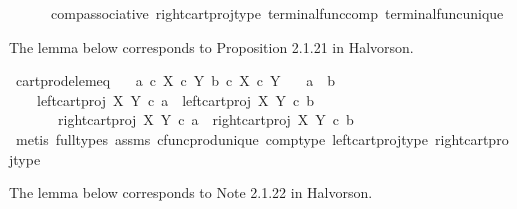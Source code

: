 \begin{isabellebody}
\ \ \ \ \ \ comp{\isacharunderscore}{\kern0pt}associative{}\ right{\isacharunderscore}{\kern0pt}cart{\isacharunderscore}{\kern0pt}proj{\isacharunderscore}{\kern0pt}type\ terminal{\isacharunderscore}{\kern0pt}func{\isacharunderscore}{\kern0pt}comp\ terminal{\isacharunderscore}{\kern0pt}func{\isacharunderscore}{\kern0pt}unique{\isacharparenright}{\kern0pt}%
\endisatagproof
{\isafoldproof}%
%
\isadelimproof
%
\endisadelimproof
%
\begin{isamarkuptext}%
The lemma below corresponds to Proposition 2.1.21 in Halvorson.%
\end{isamarkuptext}\isamarkuptrue%
\isamarkupfalse%
\ cart{\isacharunderscore}{\kern0pt}prod{\isacharunderscore}{\kern0pt}elem{\isacharunderscore}{\kern0pt}eq{\isacharcolon}{\kern0pt}\isanewline
\ \ \ {\isachardoublequoteopen}a\ {\isasymin}\isactrlsub c\ X\ {\isasymtimes}\isactrlsub c\ Y{\isachardoublequoteclose}\ {\isachardoublequoteopen}b\ {\isasymin}\isactrlsub c\ X\ {\isasymtimes}\isactrlsub c\ Y{\isachardoublequoteclose}\isanewline
\ \ \ {\isachardoublequoteopen}a\ {\isacharequal}{\kern0pt}\ b\ {\isasymlongleftrightarrow}\ \isanewline
\ \ \ \ {\isacharparenleft}{\kern0pt}left{\isacharunderscore}{\kern0pt}cart{\isacharunderscore}{\kern0pt}proj\ X\ Y\ {\isasymcirc}\isactrlsub c\ a\ {\isacharequal}{\kern0pt}\ left{\isacharunderscore}{\kern0pt}cart{\isacharunderscore}{\kern0pt}proj\ X\ Y\ {\isasymcirc}\isactrlsub c\ b\ \isanewline
\ \ \ \ \ \ {\isasymand}\ right{\isacharunderscore}{\kern0pt}cart{\isacharunderscore}{\kern0pt}proj\ X\ Y\ {\isasymcirc}\isactrlsub c\ a\ {\isacharequal}{\kern0pt}\ right{\isacharunderscore}{\kern0pt}cart{\isacharunderscore}{\kern0pt}proj\ X\ Y\ {\isasymcirc}\isactrlsub c\ b{\isacharparenright}{\kern0pt}{\isachardoublequoteclose}\isanewline
%
\isadelimproof
\ \ %
\endisadelimproof
%
\isatagproof
{}\isamarkupfalse%
\ {\isacharparenleft}{\kern0pt}metis\ {\isacharparenleft}{\kern0pt}full{\isacharunderscore}{\kern0pt}types{\isacharparenright}{\kern0pt}\ assms\ cfunc{\isacharunderscore}{\kern0pt}prod{\isacharunderscore}{\kern0pt}unique\ comp{\isacharunderscore}{\kern0pt}type\ left{\isacharunderscore}{\kern0pt}cart{\isacharunderscore}{\kern0pt}proj{\isacharunderscore}{\kern0pt}type\ right{\isacharunderscore}{\kern0pt}cart{\isacharunderscore}{\kern0pt}proj{\isacharunderscore}{\kern0pt}type{\isacharparenright}{\kern0pt}%
\endisatagproof
{\isafoldproof}%
%
\isadelimproof
%
\endisadelimproof
%
\begin{isamarkuptext}%
The lemma below corresponds to Note 2.1.22 in Halvorson.%

\end{isamarkuptext}
\end{isabellebody}
